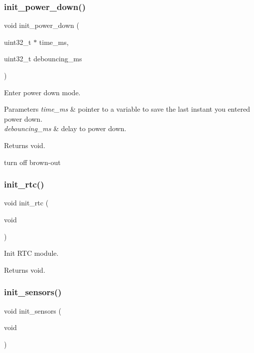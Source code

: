 \subsubsection{\texorpdfstring{init\+\_\+power\+\_\+down()}{init\_power\_down()}}
{\footnotesize\ttfamily void init\+\_\+power\+\_\+down (\begin{DoxyParamCaption}\item[{uint32\+\_\+t $\ast$}]{time\+\_\+ms,  }\item[{uint32\+\_\+t}]{debouncing\+\_\+ms }\end{DoxyParamCaption})}



Enter power down mode. 


\begin{DoxyParams}{Parameters}
{\em time\+\_\+ms} & pointer to a variable to save the last instant you entered power down. \\
\hline
{\em debouncing\+\_\+ms} & delay to power down. \\
\hline
\end{DoxyParams}
\begin{DoxyReturn}{Returns}
void. 
\end{DoxyReturn}
turn off brown-\/out \mbox{\label{i2c-rain_8ino_ab985cc69f5f573113405b4f118c96d33}} 
\subsubsection{\texorpdfstring{init\+\_\+rtc()}{init\_rtc()}}
{\footnotesize\ttfamily void init\+\_\+rtc (\begin{DoxyParamCaption}\item[{void}]{ }\end{DoxyParamCaption})}



Init R\+TC module. 

\begin{DoxyReturn}{Returns}
void. 
\end{DoxyReturn}
\mbox{\label{i2c-rain_8ino_ac74850003fab6eb3269bfe043d0f939c}} 
\subsubsection{\texorpdfstring{init\+\_\+sensors()}{init\_sensors()}}
{\footnotesize\ttfamily void init\+\_\+sensors (\begin{DoxyParamCaption}\item[{void}]{ }\end{DoxyParamCaption})}



